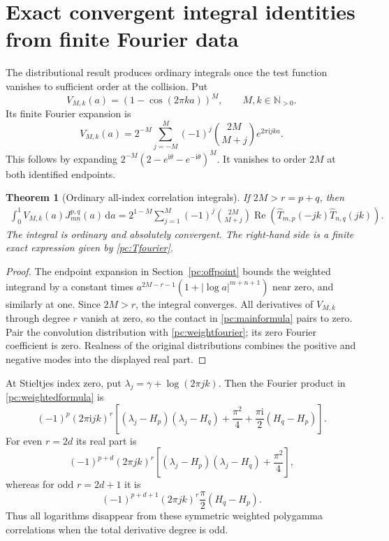 \documentclass[11pt,a4paper]{article}
\numberwithin{equation}{section}
\newtheorem{theorem}{Theorem}[section]
\theoremstyle{definition}
\newcommand{\N}{\mathbb N}
\newcommand{\da}{\,\mathrm da}
\newcommand{\ii}{\mathrm i}
\newcommand{\Rea}{\operatorname{Re}}
\begin{document}
\section{Exact convergent integral identities from finite Fourier data}\label{pc:weighted}
The distributional result produces ordinary integrals once the test function vanishes to sufficient order at the collision. Put
\begin{equation}\label{pc:weight}
 V_{M,k}(a)=(1-\cos(2\pi k a))^M,
 \qquad M,k\in\N_{>0}.
\end{equation}
Its finite Fourier expansion is
\begin{equation}\label{pc:weightfourier}
 V_{M,k}(a)=2^{-M}\sum_{j=-M}^M(-1)^j
              \binom{2M}{M+j}e^{2\pi\ii jk a}.
\end{equation}
This follows by expanding $2^{-M}(2-e^{\ii\theta}-e^{-\ii\theta})^M$. It vanishes to order $2M$ at both identified endpoints.

\begin{theorem}[Ordinary all-index correlation integrals]\label{pc:weightedtheorem}
If $2M>r=p+q$, then
\begin{align}\label{pc:weightedformula}
 \int_0^1 V_{M,k}(a)J_{mn}^{p,q}(a)\da
 =2^{1-M}\sum_{j=1}^M(-1)^j\binom{2M}{M+j}
 \Rea\!\left(\widehat T_{m,p}(-jk)\widehat T_{n,q}(jk)\right).
\end{align}
The integral is ordinary and absolutely convergent. The right-hand side is a finite exact expression given by \eqref{pc:Tfourier}.
\end{theorem}
\begin{proof}
The endpoint expansion in Section~\ref{pc:offpoint} bounds the weighted integrand by a constant times
$a^{2M-r-1}(1+|\log a|^{m+n+1})$ near zero, and similarly at one. Since $2M>r$, the integral converges. All derivatives of $V_{M,k}$ through degree $r$ vanish at zero, so the contact in \eqref{pc:mainformula} pairs to zero. Pair the convolution distribution with \eqref{pc:weightfourier}; its zero Fourier coefficient is zero. Realness of the original distributions combines the positive and negative modes into the displayed real part.
\end{proof}
At Stieltjes index zero, put $\lambda_j=\gamma+\log(2\pi jk)$. Then the Fourier product in \eqref{pc:weightedformula} is
\begin{equation}\label{pc:polyfourierproduct}
 (-1)^p(2\pi\ii jk)^r
 \left[(\lambda_j-H_p)(\lambda_j-H_q)+\frac{\pi^2}{4}
                  +\frac{\pi\ii}{2}(H_q-H_p)\right].
\end{equation}
For even $r=2d$ its real part is
\[
 (-1)^{p+d}(2\pi jk)^r
 \left[(\lambda_j-H_p)(\lambda_j-H_q)+\frac{\pi^2}{4}\right],
\]
whereas for odd $r=2d+1$ it is
\[
 (-1)^{p+d+1}(2\pi jk)^r\frac\pi2(H_q-H_p).
\]
Thus all logarithms disappear from these symmetric weighted polygamma correlations when the total derivative degree is odd.
\end{document}
